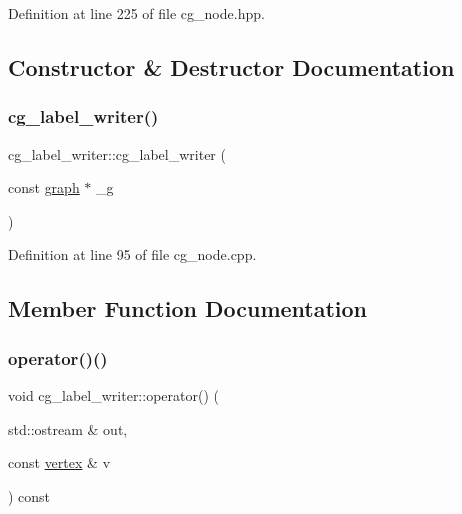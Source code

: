 Definition at line 225 of file cg\+\_\+node.\+hpp.



\subsection{Constructor \& Destructor Documentation}
\mbox{\label{classcg__label__writer_a59d101c21438fb58a0161d030f2bfc73}} 
\subsubsection{\texorpdfstring{cg\+\_\+label\+\_\+writer()}{cg\_label\_writer()}}
{\footnotesize\ttfamily cg\+\_\+label\+\_\+writer\+::cg\+\_\+label\+\_\+writer (\begin{DoxyParamCaption}\item[{const \hyperlink{structgraph}{graph} $\ast$}]{\+\_\+g }\end{DoxyParamCaption})\hspace{0.3cm}{\ttfamily [explicit]}}



Definition at line 95 of file cg\+\_\+node.\+cpp.



\subsection{Member Function Documentation}
\mbox{\label{classcg__label__writer_aa4a9dd85202a53c3565f52de30877b56}} 
\subsubsection{\texorpdfstring{operator()()}{operator()()}}
{\footnotesize\ttfamily void cg\+\_\+label\+\_\+writer\+::operator() (\begin{DoxyParamCaption}\item[{std\+::ostream \&}]{out,  }\item[{const \hyperlink{graph_8hpp_abefdcf0544e601805af44eca032cca14}{vertex} \&}]{v }\end{DoxyParamCaption}) const}



